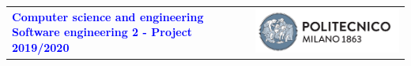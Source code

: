 


\usepackage{eso-pic,graphicx}

\usepackage[dvipsnames]{xcolor}
    \usepackage{listings}

\usepackage{hyperref}
\hypersetup{colorlinks,breaklinks,linkcolor=black,urlcolor=blue}



\begin{titlepage}




{\begin{table}[t!]
\centering
\begin{tabu} to \textwidth { X[1.3,r,p] X[1.7,l,p] }
\textcolor{Blue}
{\textbf{\small{Computer science and engineering Software engineering 2 - Project 2019/2020}}} & \includegraphics[scale=0.5]{Images/PolimiLogo}
\end{tabu}
\end{table}}~\\ [7cm]


\begin{flushleft}




\end{flushleft}
\end{titlepage}
